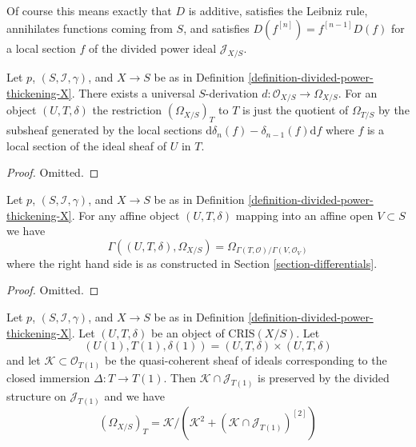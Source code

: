 \noindent
Of course this means exactly that $D$ is additive, satisfies the
Leibniz rule, annihilates functions coming from $S$, and
satisfies $D(f^{[n]}) = f^{[n - 1]}D(f)$ for a local section
$f$ of the divided power ideal $\mathcal{J}_{X/S}$.

\begin{lemma}
\label{lemma-module-of-differentials}
Let $p$, $(S, \mathcal{I}, \gamma)$, and $X \to S$ be as in
Definition \ref{definition-divided-power-thickening-X}.
There exists a universal $S$-derivation
$d : \mathcal{O}_{X/S} \to \Omega_{X/S}$.
For an object $(U, T, \delta)$ the restriction $(\Omega_{X/S})_T$
to $T$ is just the quotient of $\Omega_{T/S}$ by the subsheaf
generated by the local sections
$\text{d}\delta_n(f) - \delta_{n - 1}(f)\text{d}f$
where $f$ is a local section of the ideal sheaf of $U$ in $T$.
\end{lemma}

\begin{proof}
Omitted.
\end{proof}

\begin{lemma}
\label{lemma-module-of-differentials-on-affine}
Let $p$, $(S, \mathcal{I}, \gamma)$, and $X \to S$ be as in
Definition \ref{definition-divided-power-thickening-X}.
For any affine object $(U, T, \delta)$
mapping into an affine open $V \subset S$ we have
$$
\Gamma((U, T, \delta), \Omega_{X/S}) =
\Omega_{\Gamma(T, \mathcal{O})/\Gamma(V, \mathcal{O}_V)}
$$
where the right hand side is
as constructed in Section \ref{section-differentials}.
\end{lemma}

\begin{proof}
Omitted.
\end{proof}

\begin{lemma}
\label{lemma-describe-omega}
Let $p$, $(S, \mathcal{I}, \gamma)$, and $X \to S$ be as in
Definition \ref{definition-divided-power-thickening-X}.
Let $(U, T, \delta)$ be an object of $\text{CRIS}(X/S)$.
Let
$$
(U(1), T(1), \delta(1)) = (U, T, \delta) \times (U, T, \delta)
$$
and let $\mathcal{K} \subset \mathcal{O}_{T(1)}$ be the quasi-coherent
sheaf of ideals corresponding to the closed immersion $\Delta : T \to T(1)$.
Then $\mathcal{K} \cap \mathcal{J}_{T(1)}$ is preserved by the
divided structure on $\mathcal{J}_{T(1)}$ and we have
$$
(\Omega_{X/S})_T =
\mathcal{K}/
\left(\mathcal{K}^2 + (\mathcal{K} \cap \mathcal{J}_{T(1)})^{[2]}\right)
$$
\end{lemma}

